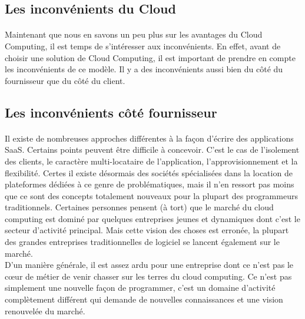 \documentclass[a4paper,12pt]{report}
\begin{document}
\begin{onehalfspace}
	\section{Les inconvénients du Cloud}
	
	\paragraph*{}
	Maintenant que nous en savons un peu plus sur les avantages du Cloud Computing, il est temps de s'intéresser aux inconvénients. En effet, avant de choisir une solution de Cloud Computing, il est important de prendre en compte les inconvénients de ce modèle. Il y a des inconvénients aussi bien du côté du fournisseur que du côté du client.
	 
	\subsection{Les inconvénients côté fournisseur}

	\paragraph*{}
	Il existe de nombreuses approches différentes à la façon d'écrire des applications SaaS. Certains points peuvent être difficile à concevoir. C'est le cas de l'isolement des clients, le caractère multi-locataire de l'application, l'approvisionnement et la flexibilité. Certes il existe désormais des sociétés spécialisées dans la location de plateformes dédiées à ce genre de problématiques, mais il n'en ressort pas moins que ce sont des concepts totalement nouveaux pour la plupart des programmeurs traditionnels. Certaines personnes pensent (à tort) que le marché du cloud computing est dominé par quelques entreprises jeunes et dynamiques dont c'est le secteur d'activité principal. Mais
cette vision des choses est erronée, la plupart des grandes entreprises traditionnelles de logiciel se lancent également sur le marché.\\
D'un manière générale, il est assez ardu pour une entreprise dont ce n'est pas le cœur de métier de venir chasser sur les terres du cloud computing. Ce n'est pas simplement une nouvelle façon de programmer, c'est un domaine d'activité complètement différent qui demande de nouvelles connaissances et une vision renouvelée du marché.


\end{onehalfspace}
\end{document}
